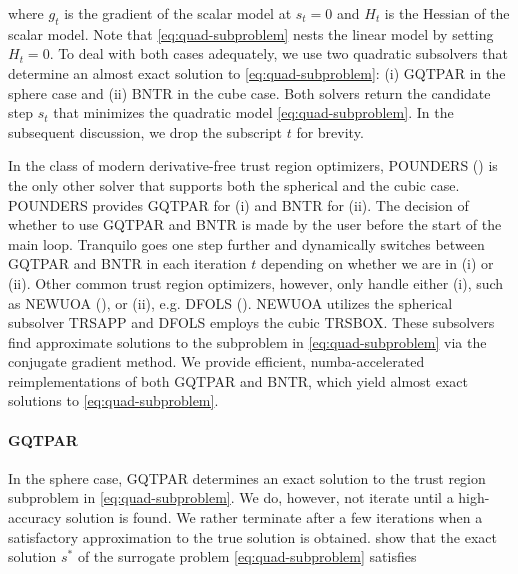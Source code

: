 \noindent where $g_t$ is the gradient of the scalar model at $s_t = 0$ and $H_t$ is the Hessian of the scalar model.
Note that \ref{eq:quad-subproblem} nests the linear model by setting $H_t=0$.
To deal with both cases adequately, we use two quadratic subsolvers that determine an almost exact solution to \ref{eq:quad-subproblem}: (i) GQTPAR in the sphere case and (ii) BNTR in the cube case.
Both solvers return the candidate step $s_t$ that minimizes the quadratic model \ref{eq:quad-subproblem}. In the subsequent discussion, we drop the subscript $t$ for brevity.

\noindent In the class of modern derivative-free trust region optimizers, POUNDERS (\cite{Wild2015}) is the only other solver that supports both the spherical and the cubic case. POUNDERS provides GQTPAR for (i) and BNTR for (ii). The decision of whether to use GQTPAR and BNTR is made by the user before the start of the main loop. Tranquilo goes one step further and dynamically switches between GQTPAR and BNTR in each iteration $t$ depending on whether we are in (i) or (ii). Other common trust region optimizers, however, only handle either (i), such as NEWUOA (\cite{newuoa2006}), or (ii), e.g. DFOLS (\cite{dfols2019}). NEWUOA utilizes the spherical subsolver TRSAPP and DFOLS employs the cubic TRSBOX. These subsolvers find approximate solutions to the subproblem in \ref{eq:quad-subproblem} via the conjugate gradient method.
We provide efficient, numba-accelerated reimplementations of both GQTPAR and BNTR, which yield almost exact solutions to \ref{eq:quad-subproblem}.



\paragraph{GQTPAR}

In the sphere case, GQTPAR determines an exact solution to the trust region
subproblem in \ref{eq:quad-subproblem}. We do, however, not iterate until a high-accuracy solution is found. We rather terminate after a few iterations when a satisfactory approximation to the true solution is obtained.\cite{More1983} show that the exact solution $s^*$ of the surrogate problem \ref{eq:quad-subproblem} satisfies

